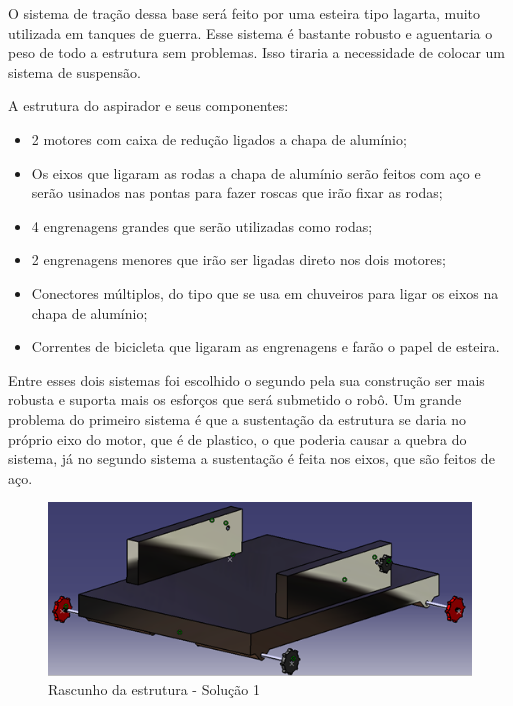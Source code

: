 		O sistema de tração dessa base será feito por uma esteira tipo lagarta, muito utilizada em tanques de guerra. Esse sistema é bastante robusto e aguentaria o peso de todo a estrutura sem problemas. Isso tiraria a necessidade de colocar um sistema de suspensão.

		A estrutura do aspirador e seus componentes:

		\begin{itemize}
			\item 2 motores com caixa de redução ligados a chapa de alumínio;
			\item Os eixos que ligaram as rodas a chapa de alumínio serão feitos com aço e serão usinados nas pontas para fazer roscas que irão fixar as rodas;
			\item 4 engrenagens grandes que serão utilizadas como rodas;
			\item 2 engrenagens menores que irão ser ligadas direto nos dois motores;
			\item Conectores múltiplos, do tipo que se usa em chuveiros para ligar os eixos na chapa de alumínio;
			\item Correntes de bicicleta que ligaram as engrenagens e farão o papel de esteira.
		\end{itemize}

		Entre esses dois sistemas foi escolhido o segundo pela sua construção ser mais robusta e suporta mais os esforços que será submetido o robô. Um grande problema do primeiro sistema é que a sustentação da estrutura se daria no próprio eixo do motor, que é de plastico, o que poderia causar a quebra do sistema, já no segundo sistema a sustentação é feita nos eixos, que são feitos de aço.
		
		\begin{figure}[H]
			\centering
			\includegraphics[scale=0.8]{figuras/rascunho_estrutura.png}
			\caption{Rascunho da estrutura - Solução 1}
			\label{img:rascunho1}
		\end{figure}


